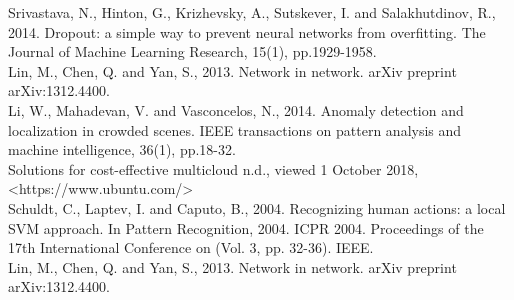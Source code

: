 \newline
[50] Srivastava, N., Hinton, G., Krizhevsky, A., Sutskever, I. and Salakhutdinov, R., 2014. Dropout: a simple way to prevent neural networks from overfitting. The Journal of Machine Learning Research, 15(1), pp.1929-1958.\\
\newline
[51] Lin, M., Chen, Q. and Yan, S., 2013. Network in network. arXiv preprint arXiv:1312.4400.\\
\newline
[52] Li, W., Mahadevan, V. and Vasconcelos, N., 2014. Anomaly detection and localization in crowded scenes. IEEE transactions on pattern analysis and machine intelligence, 36(1), pp.18-32.\\
\newline
[53] Solutions for cost-effective multicloud n.d., viewed 1 October 2018,\\ <https://www.ubuntu.com/> \\
\newline
[54] Schuldt, C., Laptev, I. and Caputo, B., 2004. Recognizing human actions: a local SVM approach. In Pattern Recognition, 2004. ICPR 2004. Proceedings of the 17th International Conference on (Vol. 3, pp. 32-36). IEEE.\\
\newline
[55] Lin, M., Chen, Q. and Yan, S., 2013. Network in network. arXiv preprint arXiv:1312.4400.


